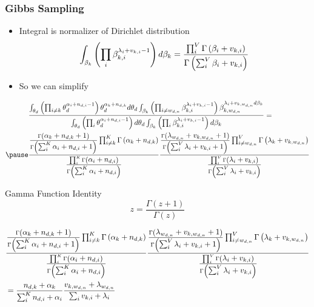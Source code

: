 \begin{frame}
\frametitle{Gibbs Sampling}
\begin{itemize}
\item Integral is normalizer of Dirichlet distribution
\begin{equation*}
\int_{\beta_{k}}    \left( \prod_{i} \beta_{k,i} ^{ \lambda_i + v_{k,i} - 1} \right) d\beta_k = \dirfunc{i}{V}{\beta_i + v_{k,i}}
\end{equation*}
\pause
\item So we can simplify
\end{itemize}
\begin{footnotesize}
\begin{align*}
& \frac{ \int_{\theta_d} \left( \prod_{i \not = k} \theta_d^{\alpha_i + n_{d,i}
      - 1} \right)\theta_d^{\alpha_k + n_{d,k} } d\theta_d \int_{\beta_{k}}
  \left( \prod_{i \not = w_{d,n}} \beta_{k,i} ^{ \lambda_i + v_{k,i} - 1}
  \right) \beta_{k, w_{d,n}}^{\lambda_i + v_{k,w_{d,n}} d\beta_k }} { \int_{\theta_d}
  \left( \prod_{i} \theta_d^{\alpha_i + n_{d,i} - 1} \right) d\theta_d
  \int_{\beta_{k}}    \left( \prod_{i} \beta_{k,i} ^{ \lambda_i + v_{k,i} - 1}
  \right) d\beta_k } = \\ \pause
& \frac{
  \dirnum{i \not = k}{K}{\alpha_k + n_{d,k} + 1}{ \G{\sum_{i}^{K} \alpha_i +
      n_{d,i} + 1} } \G{\alpha_k + n_{d,k}}  }{ \dirfunc{i}{K}{\alpha_i + n_{d,i}} }
 \frac{
 \dirnum{i \not = w_{d,n}}{V}{\lambda_{w_{d,n}} + v_{k,w_{d,n}} + 1}{ \G{\sum_{i}^{V} \lambda_i + v_{k,i} + 1} } \G{\lambda_k + v_{k,w_{d,n}}}
}{ \dirfunc{i}{V}{\lambda_i + v_{k,i}} } \\
\end{align*}
\end{footnotesize}
\end{frame}


\begin{frame}

\begin{block}{Gamma Function Identity}
	\begin{equation}
		z = \frac{\Gamma(z + 1)}{\Gamma(z)}
	\end{equation}
\end{block}

\begin{footnotesize}
\begin{align*}
& \frac{
  \dirnum{i \not = k}{K}{\alpha_k + n_{d,k} + 1}{ \G{\sum_{i}^{K} \alpha_i +
      n_{d,i} + 1} } \G{\alpha_k + n_{d,k}}  }
{ \dirfunc{i}{K}{\alpha_i + n_{d,i}} }
\frac{
 \dirnum{i \not = w_{d,n}}{V}{\lambda_{w_{d,n}} + v_{k,w_{d,n}} + 1}{ \G{\sum_{i}^{V} \lambda_i + v_{k,i} + 1} } \G{\lambda_k + v_{k,w_{d,n}}}
}{ \dirfunc{i}{V}{\lambda_i + v_{k,i}} } \\
& = \frac{n_{d, k} + \alpha_k}{ \sum_{i}^{K} { n_{d,i} + \alpha_i}} \frac{v_{k, w_{d,n}} + \lambda_{w_{d,n}}}{ \sum_{i} { v_{k,i} + \lambda_{i} }}
\end{align*}
\end{footnotesize}

\end{frame}

